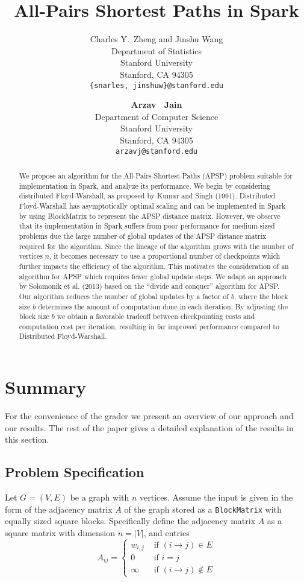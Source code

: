 \documentclass{article} %
\title{All-Pairs Shortest Paths in Spark}
\author{
Charles Y.~Zheng and Jinshu Wang\\
Department of Statistics\\
Stanford University\\
Stanford, CA 94305 \\
\texttt{\{snarles, jinshuw\}@stanford.edu} \\
\and
\textbf{Arzav ~Jain} \\
Department of Computer Science\\
Stanford University\\
Stanford, CA 94305 \\
\texttt{arzavj@stanford.edu} \\
}
\begin{document}
\maketitle

\begin{abstract}
We propose an algorithm for the All-Pairs-Shortest-Paths (APSP)
problem suitable for implementation in Spark, and analyze its
performance.  We begin by considering distributed Floyd-Warshall, as
proposed by Kumar and Singh (1991).  Distributed Floyd-Warshall has
asymptotically optimal scaling and can be implemented in Spark by
using BlockMatrix to represent the APSP distance matrix.  However, we
observe that its implementation in Spark suffers from poor performance
for medium-sized problems due the large number of global updates of
the APSP distance matrix required for the algorithm.  Since the
lineage of the algorithm grows with the number of vertices $n$, it
becomes necessary to use a proportional number of checkpoints which
further impacts the efficiency of the algorithm. This motivates the
consideration of an algorithm for APSP which requires fewer global
update steps.  We adapt an approach by Solomonik et al. (2013) based
on the ``divide and conquer'' algorithm for APSP.  Our algorithm
reduces the number of global updates by a factor of $b$, where the
block size $b$ determines the amount of computation done in each
iteration.  By adjusting the block size $b$ we obtain a favorable
tradeoff between checkpointing costs and computation cost per
iteration, resulting in far improved performance compared to
Distributed Floyd-Warshall.
\end{abstract}

\section{Summary}

For the convenience of the grader we present an overview of our
approach and our results.  The rest of the paper gives a detailed
explanation of the results in this section.

\subsection{Problem Specification}

Let $G = (V, E)$ be a graph with $n$ vertices.  Assume the input is
given in the form of the adjacency matrix $A$ of the graph stored as a
{\tt BlockMatrix} with equally sized square blocks.  Specifically
define the adjacency matrix $A$ as a square matrix with dimension $n =
|V|$, and entries
\[
A_{ij} = 
\begin{cases}
w_{i, j} &\text{ if } (i \to j) \in E\\
0 &\text{ if } i = j\\
\infty &\text{ if } (i \to j) \notin E
\end{cases}
\]
\end{document}
